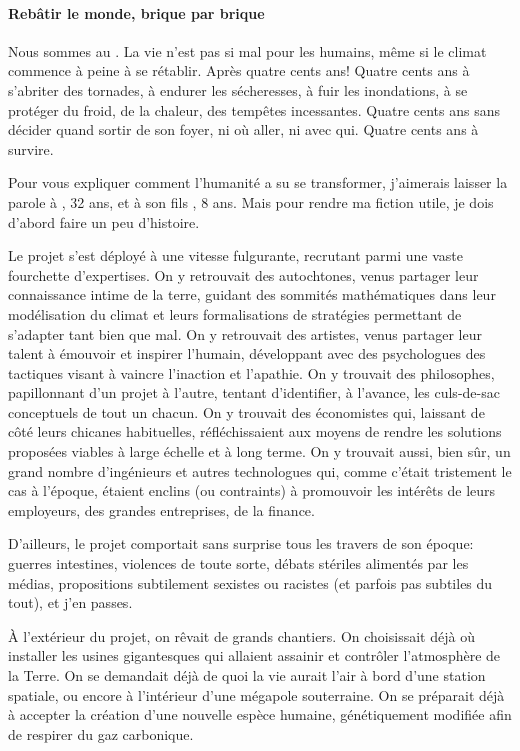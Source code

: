 \paragraph{Rebâtir le monde, brique par brique}

Nous sommes au \siecle. La vie n'est pas si mal pour les humains, même si le
climat commence à peine à se rétablir. Après quatre cents ans! Quatre cents ans à
s'abriter des tornades, à endurer les sécheresses, à fuir les inondations, à se
protéger du froid, de la chaleur, des tempêtes incessantes. Quatre cents ans
sans décider quand sortir de son foyer, ni où aller, ni avec qui.
Quatre cents ans à survire.

Pour vous expliquer comment l'humanité a su se transformer, j'aimerais
laisser la parole à \nomMere{}, 32 ans, et à son fils \nomEnfant{}, 8 ans.
Mais pour rendre ma fiction utile, je dois d'abord faire un peu
d'histoire.  


Le projet \nomProjet{} s'est déployé à une vi\-tesse
fulgurante, recrutant parmi une vaste fourchette d'expertises.  On y
retrouvait des autochtones, venus partager leur connaissance intime de la
terre, guidant des sommités mathé\-matiques dans leur modélisation du climat et
leurs formalisations de stra\-tégies permettant de s'adapter tant
bien que mal.  On y retrouvait des artistes, venus partager leur talent à
émouvoir et inspirer l'humain, développant avec des psychologues des
tactiques visant à vaincre l'in\-act\-ion et l'apathie.  On y trouvait des
philosophes, papillonnant d'un projet à l'autre, tentant d'identifier, à
l'avance, les culs-de-sac con\-cept\-uels de tout un chacun.  On y trouvait
des économistes qui, laissant de côté leurs chicanes habituelles,
réfléchissaient aux moyens de rendre les solutions proposées viables à
large échelle et à long terme.  On y trouvait aussi, bien sûr, un grand
nombre d'ingénieurs et autres technologues qui, comme c'était trist\-ement
le cas à l'époque, étaient enclins (ou contraints) à promouvoir les
intérêts de leurs employeurs, des grandes entreprises, de la finance.

D'ailleurs, le projet \nomProjet{} comportait sans surprise tous les
travers de son époque: guerres intestines, violences de toute sorte, débats
stériles alimentés par les médias, propositions
subti\-le\-ment sexistes ou racistes (et parfois pas subtiles du tout), et
j'en passes.

À l'extérieur du projet, on rêvait de grands chantiers.  On choisissait
déjà où installer les usines gigantesques qui allaient assainir et
contrô\-ler l'at\-mosphère de la Terre. On se demandait déjà de quoi la vie
aurait l'air à bord d'une station spatiale, ou encore à l'intérieur d'une
mégapole souterraine. On se préparait déjà à accepter la création d'une
nouvelle espèce humaine, génétiquement modifiée afin de respirer du gaz
carbo\-nique.

